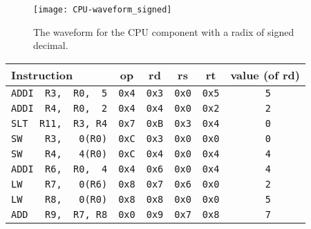 \documentclass[11pt]{report}
\begin{document}
\begin{figure}[h!]
    \centering
    \texttt{[image: CPU-waveform\_signed]}
    \caption{The waveform for the CPU component with a radix of signed decimal.}
    \label{fig:CPU-waveform_signed}
\end{figure}

\begin{table}[ht!]
    \centering
    \begin{tabular}{|l||c|c|c|c|c|} 
     \hline
     Instruction & op & rd & rs & rt & value (of rd) \\
     \hline
     \verb|ADDI  R3,  R0,  5| & \verb|0x4| & \verb|0x3| & \verb|0x0| & \verb|0x5| & \verb| 5| \\ 
     \hline                                                                                
     \verb|ADDI  R4,  R0,  2| & \verb|0x4| & \verb|0x4| & \verb|0x0| & \verb|0x2| & \verb| 2| \\
     \hline                                                                              
     \verb|SLT  R11,  R3, R4| & \verb|0x7| & \verb|0xB| & \verb|0x3| & \verb|0x4| & \verb| 0| \\
     \hline                                                                              
     \verb|SW    R3,   0(R0)| & \verb|0xC| & \verb|0x3| & \verb|0x0| & \verb|0x0| & \verb| 0| \\
     \hline                                                                                
     \verb|SW    R4,   4(R0)| & \verb|0xC| & \verb|0x4| & \verb|0x0| & \verb|0x4| & \verb| 4| \\ 
     \hline                                                                                
     \verb|ADDI  R6,  R0,  4| & \verb|0x4| & \verb|0x6| & \verb|0x0| & \verb|0x4| & \verb| 4| \\
     \hline                                                                                
     \verb|LW    R7,   0(R6)| & \verb|0x8| & \verb|0x7| & \verb|0x6| & \verb|0x0| & \verb| 2| \\
     \hline                                                                                
     \verb|LW    R8,   0(R0)| & \verb|0x8| & \verb|0x8| & \verb|0x0| & \verb|0x0| & \verb| 5| \\
     \hline
     \verb|ADD   R9,  R7, R8| & \verb|0x0| & \verb|0x9| & \verb|0x7| & \verb|0x8| & \verb| 7| \\
     \hline                                                                              

\end{tabular}
\end{table}
\end{document}
